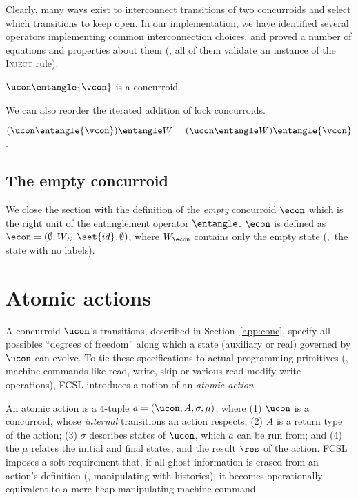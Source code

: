 Clearly, many ways exist to interconnect transitions of two
concurroids and select which transitions to keep open. In our
implementation, we have identified several operators implementing
common interconnection choices, and proved a number of equations and
properties about them (\eg, all of them validate an instance of the
\textsc{Inject} rule).

\vspace{5pt}
\begin{lemma} 
%
${\ucon} \entangle {\vcon}$ is a concurroid. 

\end{lemma}

We can also reorder the iterated addition of lock concurroids.

\vspace{5pt}
\begin{lemma} $({\ucon} \entangle {\vcon}) \entangle W = ({\ucon}
  \entangle W) \entangle {\vcon}$.\end{lemma}

\subsection{The empty concurroid}
\label{sec:empty-concurroid}

We close the section with the definition of the \emph{empty}
concurroid $\econ$ which is the right unit of the entanglement
operator $\entangle$. $\econ$ is defined as $\econ = (\emptyset,
{W}_E, \set{id}, \emptyset)$, where ${W}_\econ$ contains only the
empty state (\ie,~the state with no labels).


\section{Atomic actions}
\label{sec:appactions}

A concurroid $\ucon$'s transitions, described in
Section~\ref{app:conc}, specify all possibles ``degrees of freedom''
along which a state (auxiliary or real) governed by $\ucon$ can
evolve. To tie these specifications to actual programming primitives
(\ie, machine commands like \textsf{read}, \textsf{write},
\textsf{skip} or various read-modify-write operations), FCSL
introduces a notion of an \emph{atomic action}.

An atomic action is a 4-tuple $a = (\ucon, A, \sigma, \mu)$, where (1)
$\ucon$ is a concurroid, whose \emph{internal} transitions an action
respects; (2) $A$ is a return type of the action; (3) $\sigma$
describes states of $\ucon$, which $a$ can be run from; and (4) the
$\mu$ relates the initial and final states, and the result $\res$ of
the action. FCSL imposes a soft requirement that, if all ghost
information is erased from an action's definition (\eg, manipulating
with histories), it becomes operationally equivalent to a mere
heap-manipulating machine command.


